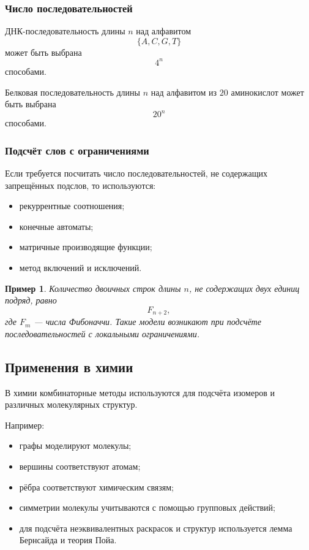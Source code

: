 \documentclass[12pt,a4paper]{article}
\newtheorem{example}{Пример}
\begin{document}
\subsubsection{Число последовательностей}

ДНК-последовательность длины $n$ над алфавитом
\[
\{A,C,G,T\}
\]
может быть выбрана
\[
4^n
\]
способами.

Белковая последовательность длины $n$ над алфавитом из $20$ аминокислот может быть выбрана
\[
20^n
\]
способами.

\subsubsection{Подсчёт слов с ограничениями}

Если требуется посчитать число последовательностей, не содержащих запрещённых подслов, то используются:
\begin{itemize}
    \item рекуррентные соотношения;
    \item конечные автоматы;
    \item матричные производящие функции;
    \item метод включений и исключений.
\end{itemize}

\begin{example}
Количество двоичных строк длины $n$, не содержащих двух единиц подряд, равно
\[
F_{n+2},
\]
где $F_m$ --- числа Фибоначчи.
Такие модели возникают при подсчёте последовательностей с локальными ограничениями.
\end{example}

\subsection{Применения в химии}

В химии комбинаторные методы используются для подсчёта изомеров и различных молекулярных структур.

Например:
\begin{itemize}
    \item графы моделируют молекулы;
    \item вершины соответствуют атомам;
    \item рёбра соответствуют химическим связям;
    \item симметрии молекулы учитываются с помощью групповых действий;
    \item для подсчёта неэквивалентных раскрасок и структур используется лемма Бернсайда и теория Пойа.
\end{itemize}
\end{document}
